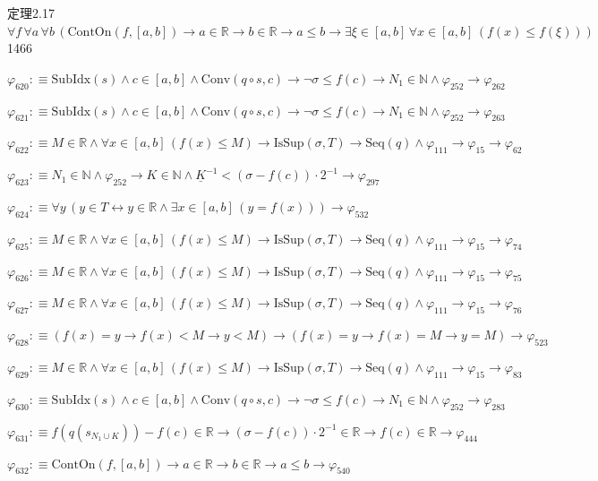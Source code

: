 \begin{fullproof}{定理2.17}{$\forall f\,\forall a\,\forall b\,(\mathrm{ContOn}(f,[a,b]) \to a \in \mathbb{R} \to b \in \mathbb{R} \to a \leq b \to \exists \xi \in [a,b]\,\forall x \in [a,b]\,(f(x) \leq f(\xi)))$}{1466}
\begin{abbrevlist}
\item $\varphi_{620} :\equiv \mathrm{SubIdx}(s) \land c \in [a,b] \land \mathrm{Conv}(q \circ s,c) \to \neg \sigma \leq f(c) \to N_{1} \in \mathbb{N} \land \varphi_{252} \to \varphi_{262}$
\item $\varphi_{621} :\equiv \mathrm{SubIdx}(s) \land c \in [a,b] \land \mathrm{Conv}(q \circ s,c) \to \neg \sigma \leq f(c) \to N_{1} \in \mathbb{N} \land \varphi_{252} \to \varphi_{263}$
\item $\varphi_{622} :\equiv M \in \mathbb{R} \land \forall x \in [a,b]\,(f(x) \leq M) \to \mathrm{IsSup}(\sigma,T) \to \mathrm{Seq}(q) \land \varphi_{111} \to \varphi_{15} \to \varphi_{62}$
\item $\varphi_{623} :\equiv N_{1} \in \mathbb{N} \land \varphi_{252} \to K \in \mathbb{N} \land \underline{K}^{-1} < (\sigma - f(c)) \cdot 2^{-1} \to \varphi_{297}$
\item $\varphi_{624} :\equiv \forall y\,(y \in T \leftrightarrow y \in \mathbb{R} \land \exists x \in [a,b]\,(y = f(x))) \to \varphi_{532}$
\item $\varphi_{625} :\equiv M \in \mathbb{R} \land \forall x \in [a,b]\,(f(x) \leq M) \to \mathrm{IsSup}(\sigma,T) \to \mathrm{Seq}(q) \land \varphi_{111} \to \varphi_{15} \to \varphi_{74}$
\item $\varphi_{626} :\equiv M \in \mathbb{R} \land \forall x \in [a,b]\,(f(x) \leq M) \to \mathrm{IsSup}(\sigma,T) \to \mathrm{Seq}(q) \land \varphi_{111} \to \varphi_{15} \to \varphi_{75}$
\item $\varphi_{627} :\equiv M \in \mathbb{R} \land \forall x \in [a,b]\,(f(x) \leq M) \to \mathrm{IsSup}(\sigma,T) \to \mathrm{Seq}(q) \land \varphi_{111} \to \varphi_{15} \to \varphi_{76}$
\item $\varphi_{628} :\equiv (f(x) = y \to f(x) < M \to y < M) \to (f(x) = y \to f(x) = M \to y = M) \to \varphi_{523}$
\item $\varphi_{629} :\equiv M \in \mathbb{R} \land \forall x \in [a,b]\,(f(x) \leq M) \to \mathrm{IsSup}(\sigma,T) \to \mathrm{Seq}(q) \land \varphi_{111} \to \varphi_{15} \to \varphi_{83}$
\item $\varphi_{630} :\equiv \mathrm{SubIdx}(s) \land c \in [a,b] \land \mathrm{Conv}(q \circ s,c) \to \neg \sigma \leq f(c) \to N_{1} \in \mathbb{N} \land \varphi_{252} \to \varphi_{283}$
\item $\varphi_{631} :\equiv f(q(s_{N_{1} \cup K})) - f(c) \in \mathbb{R} \to (\sigma - f(c)) \cdot 2^{-1} \in \mathbb{R} \to f(c) \in \mathbb{R} \to \varphi_{444}$
\item $\varphi_{632} :\equiv \mathrm{ContOn}(f,[a,b]) \to a \in \mathbb{R} \to b \in \mathbb{R} \to a \leq b \to \varphi_{540}$

\end{abbrevlist}
\end{fullproof}
